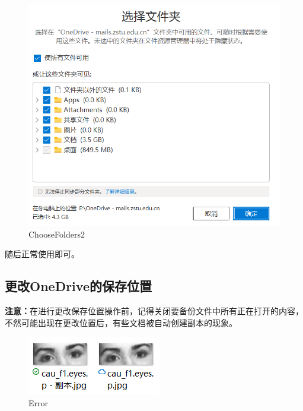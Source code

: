 \documentclass[]{ctexbook}
\theoremstyle{definition}
\theoremstyle{definition}
\theoremstyle{definition}
\theoremstyle{definition}
\theoremstyle{remark}
\begin{document}
\begin{figure}

{\centering \includegraphics[width=1\linewidth]{img/OneDrive/ChooseFolders2} 

}

\caption{ChooseFolders2}\label{fig:OneDrive-ChooseFolders2}
\end{figure}

随后正常使用即可。

\subsection{更改OneDrive的保存位置}\label{ux66f4ux6539onedriveux7684ux4fddux5b58ux4f4dux7f6e}

\textbf{注意：}在进行更改保存位置操作前，记得关闭要备份文件中所有正在打开的内容，不然可能出现在更改位置后，有些文档被自动创建副本的现象。

\begin{figure}

{\centering \includegraphics[width=0.6\linewidth]{img/OneDrive/Error1} 

}

\caption{Error}\label{fig:OneDrive-Error1}
\end{figure}
\end{document}
